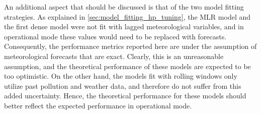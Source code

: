 An additional aspect that should be discussed is that of the two model fitting strategies. As explained in \cref{sec:model_fitting_hp_tuning}, the MLR model and the first dense model were not fit with lagged meteorological variables, and in operational mode these values would need to be replaced with forecasts. Consequently, the performance metrics reported here are under the assumption of meteorological forecasts that are exact. Clearly, this is an unreasonable assumption, and the theoretical performance of these models are expected to be too optimistic. On the other hand, the models fit with rolling windows only utilize past pollution and weather data, and therefore do not suffer from this added uncertainty. Hence, the theoretical performance for these models should better reflect the expected performance in operational mode. 



%








%
%
%


